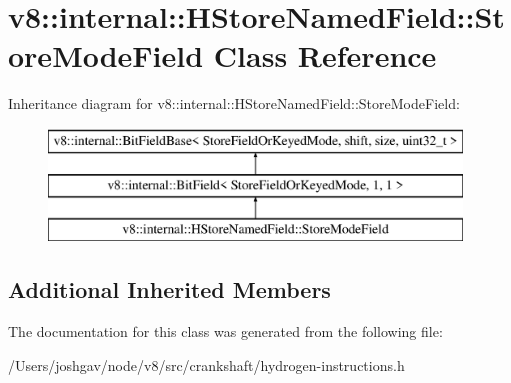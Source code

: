 \hypertarget{classv8_1_1internal_1_1_h_store_named_field_1_1_store_mode_field}{}\section{v8\+:\+:internal\+:\+:H\+Store\+Named\+Field\+:\+:Store\+Mode\+Field Class Reference}
\label{classv8_1_1internal_1_1_h_store_named_field_1_1_store_mode_field}
Inheritance diagram for v8\+:\+:internal\+:\+:H\+Store\+Named\+Field\+:\+:Store\+Mode\+Field\+:\begin{figure}[H]
\begin{center}
\leavevmode
\includegraphics[height=3.000000cm]{classv8_1_1internal_1_1_h_store_named_field_1_1_store_mode_field}
\end{center}
\end{figure}
\subsection*{Additional Inherited Members}


The documentation for this class was generated from the following file\+:\begin{DoxyCompactItemize}
\item 
/\+Users/joshgav/node/v8/src/crankshaft/hydrogen-\/instructions.\+h\end{DoxyCompactItemize}
